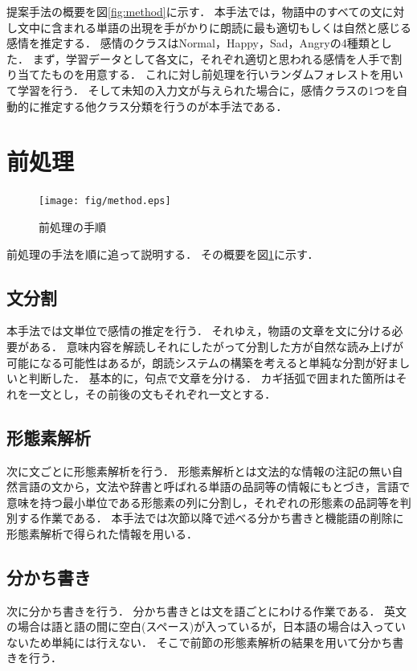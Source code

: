 提案手法の概要を図\ref{fig:method}に示す．
本手法では，物語中のすべての文に対し文中に含まれる単語の出現を手がかりに朗読に最も適切もしくは自然と感じる感情を推定する．
感情のクラスはNormal，Happy，Sad，Angryの4種類とした．
まず，学習データとして各文に，それぞれ適切と思われる感情を人手で割り当てたものを用意する．
これに対し前処理を行いランダムフォレストを用いて学習を行う．
そして未知の入力文が与えられた場合に，感情クラスの1つを自動的に推定する他クラス分類を行うのが本手法である．

\section{前処理}

\begin{figure}[ht]
  \begin{center}
    \texttt{[image: fig/method.eps]}
    \caption{前処理の手順}
    \label{fig:pre}
  \end{center}
\end{figure}

前処理の手法を順に追って説明する．
その概要を図\ref{fig:pre}に示す．


\subsection{文分割}
本手法では文単位で感情の推定を行う．
それゆえ，物語の文章を文に分ける必要がある．
意味内容を解読しそれにしたがって分割した方が自然な読み上げが可能になる可能性はあるが，朗読システムの構築を考えると単純な分割が好ましいと判断した．
基本的に，句点で文章を分ける．
カギ括弧で囲まれた箇所はそれを一文とし，その前後の文もそれぞれ一文とする．

\subsection{形態素解析}
次に文ごとに形態素解析を行う．
形態素解析とは文法的な情報の注記の無い自然言語の文から，文法や辞書と呼ばれる単語の品詞等の情報にもとづき，言語で意味を持つ最小単位である形態素の列に分割し，それぞれの形態素の品詞等を判別する作業である．
本手法では次節以降で述べる分かち書きと機能語の削除に形態素解析で得られた情報を用いる．

\subsection{分かち書き}
次に分かち書きを行う．
分かち書きとは文を語ごとにわける作業である．
英文の場合は語と語の間に空白(スペース)が入っているが，日本語の場合は入っていないため単純には行えない．
そこで前節の形態素解析の結果を用いて分かち書きを行う．

